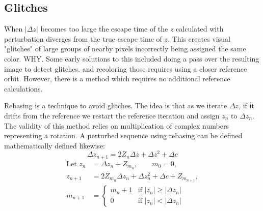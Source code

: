 \documentclass{article}
\begin{document}
\subsection{Glitches}
When $|\Delta z|$ becomes too large the escape time of the $z$ calculated with perturbation diverges from the true escape time of $z$. This creates visual "glitches" of large groups of nearby pixels incorrectly being assigned the same color. WHY. Some early solutions to this included doing a pass over the resulting image to detect glitches, and recoloring those requires using a closer reference orbit. However, there is a method which requires no additional reference calculations.
\par Rebasing is a technique to avoid glitches. The idea is that as we iterate $\Delta z$, if it drifts from the reference we restart the reference iteration and assign $z_n$ to $\Delta z_n$. The validity of this method relies on multiplication of complex numbers representing a rotation\cite{Zhouran_}. A perturbed sequence using rebasing can be defined mathematically defined likewise: 
\[\Delta z_{n+1} = 2Z_n\Delta z+\Delta z^2 + \Delta c\]
\[
\begin{aligned}
    \text{Let } z_n &= \Delta z_n+Z_{m_n}, \qquad m_0=0, \\
    z_{n+1} &= 2Z_{m_n}\Delta z_n+\Delta z_n^2 + \Delta c + Z_{m_{n+1}}, \\
    m_{n+1} &= \begin{cases}
        m_n+1 & \text{if } |z_n| \geq |\Delta z_n|\\
        0 & \text{if } |z_n| < |\Delta z_n|
    \end{cases}
\end{aligned}
\]
\end{document}
